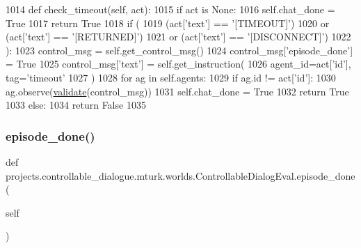 \begin{DoxyCode}
1014     \textcolor{keyword}{def }check\_timeout(self, act):
1015         \textcolor{keywordflow}{if} act \textcolor{keywordflow}{is} \textcolor{keywordtype}{None}:
1016             self.chat\_done = \textcolor{keyword}{True}
1017             \textcolor{keywordflow}{return} \textcolor{keyword}{True}
1018         \textcolor{keywordflow}{if} (
1019             (act[\textcolor{stringliteral}{'text'}] == \textcolor{stringliteral}{'[TIMEOUT]'})
1020             \textcolor{keywordflow}{or} (act[\textcolor{stringliteral}{'text'}] == \textcolor{stringliteral}{'[RETURNED]'})
1021             \textcolor{keywordflow}{or} (act[\textcolor{stringliteral}{'text'}] == \textcolor{stringliteral}{'[DISCONNECT]'})
1022         ):
1023             control\_msg = self.get\_control\_msg()
1024             control\_msg[\textcolor{stringliteral}{'episode\_done'}] = \textcolor{keyword}{True}
1025             control\_msg[\textcolor{stringliteral}{'text'}] = self.get\_instruction(
1026                 agent\_id=act[\textcolor{stringliteral}{'id'}], tag=\textcolor{stringliteral}{'timeout'}
1027             )
1028             \textcolor{keywordflow}{for} ag \textcolor{keywordflow}{in} self.agents:
1029                 \textcolor{keywordflow}{if} ag.id != act[\textcolor{stringliteral}{'id'}]:
1030                     ag.observe(\hyperlink{namespaceparlai_1_1core_1_1worlds_afc3fad603b7bce41dbdc9cdc04a9c794}{validate}(control\_msg))
1031             self.chat\_done = \textcolor{keyword}{True}
1032             \textcolor{keywordflow}{return} \textcolor{keyword}{True}
1033         \textcolor{keywordflow}{else}:
1034             \textcolor{keywordflow}{return} \textcolor{keyword}{False}
1035 
\end{DoxyCode}
\mbox{\label{classprojects_1_1controllable__dialogue_1_1mturk_1_1worlds_1_1ControllableDialogEval_a491b1a63d694486f7414da91e82d5c7d}} 
\subsubsection{\texorpdfstring{episode\+\_\+done()}{episode\_done()}}
{\footnotesize\ttfamily def projects.\+controllable\+\_\+dialogue.\+mturk.\+worlds.\+Controllable\+Dialog\+Eval.\+episode\+\_\+done (\begin{DoxyParamCaption}\item[{}]{self }\end{DoxyParamCaption})}



